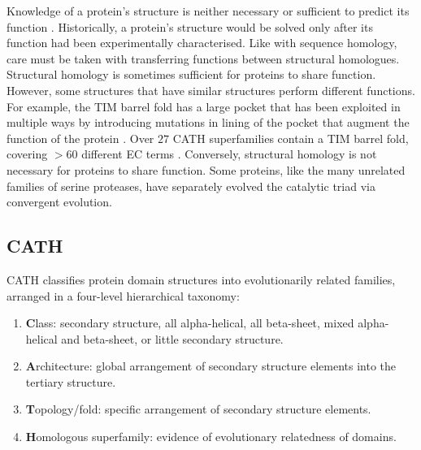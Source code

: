Knowledge of a protein's structure is neither necessary or sufficient to predict its function \cite{Grabowski2007,Loewenstein2009}. Historically, a protein's structure would be solved only after its function had been experimentally characterised. Like with sequence homology, care must be taken with transferring functions between structural homologues. Structural homology is sometimes sufficient for proteins to share function. However, some structures that have similar structures perform different functions. For example, the TIM barrel fold has a large pocket that has been exploited in multiple ways by introducing mutations in lining of the pocket that augment the function of the protein \cite{Glasner2006,Hannenhalli2000}. Over $27$ CATH superfamilies \cite{Sillitoe2019} contain a TIM barrel fold, covering $> 60$ different EC terms \cite{Lee2007}. Conversely, structural homology is not necessary for proteins to share function. Some proteins, like the many unrelated families of serine proteases, have separately evolved the catalytic triad via convergent evolution.


\subsection{CATH}
\label{sec:intro-cath}

CATH \cite{Orengo1999,Orengo1997,Sillitoe2019} classifies protein domain structures into evolutionarily related families, arranged in a four-level hierarchical taxonomy:

\begin{enumerate}
    \item \textbf{C}lass: secondary structure, all alpha-helical, all beta-sheet, mixed alpha-helical and beta-sheet, or little secondary structure.
    \item \textbf{A}rchitecture: global arrangement of secondary structure elements into the tertiary structure.
    \item \textbf{T}opology/fold: specific arrangement of secondary structure elements.
    \item \textbf{H}omologous superfamily: evidence of evolutionary relatedness of domains.
\end{enumerate}


